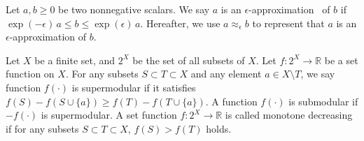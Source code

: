 \documentclass{article}
\newcommand{\eps}{\epsilon}
\newtheorem{proposition}[theo]{Proposition}
\begin{document}
Let $a,b\geq 0$ be two nonnegative scalars.
We say $a$ is an $\eps$-approximation~\cite{PS14} of $b$ if
$\exp(-\eps)\, a \leq b \leq \exp(\eps)\, a$. Hereafter, we use $a \approx_{\eps} b$ to represent that $a$ is an $\eps$-approximation of $b$.

Let $X$ be a finite set, and $2^X$ be the set of all subsets of $X$.  %
Let $f: 2^X \to \mathbb{R}$ be a set function on $X$. For any subsets $S \subset T \subset X$ and any element $a \in X \setminus T$, we say function $f(\cdot)$ is supermodular if it satisfies $f(S) - f(S \cup \{a\}) \geq f(T) - f(T \cup \{a\})$. A function $f(\cdot)$ is submodular if $-f(\cdot)$ is supermodular.
A set function $f: 2^X \to \mathbb{R}$ is called monotone decreasing if for any subsets $S \subset T \subset X$,
 $f(S) > f(T)$ holds.
\end{document}
